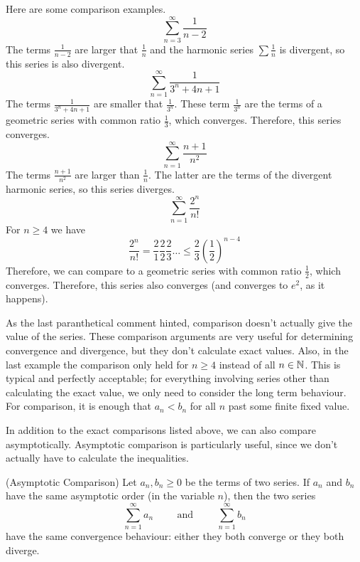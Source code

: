 \documentclass[fleqn,letterpaper]{report}
\begin{document}
\begin{example} Here are some comparison examples.
\label{example-comparison1}
\begin{equation*}
\sum_{n=3}^\infty \frac{1}{n-2}
\end{equation*}
The terms $\frac{1}{n-2}$ are larger that $\frac{1}{n}$ and
the harmonic series $\sum \frac{1}{n}$ is divergent, so this
series is also divergent.
\begin{equation*}
\sum_{n=1}^\infty \frac{1}{3^n + 4n + 1}
\end{equation*}
The terms $\frac{1}{3^n + 4n + 1}$ are smaller that
$\frac{1}{3^n}$. These term $\frac{1}{3^n}$ are the terms of a geometric
series with common ratio $\frac{1}{3}$, which
converges. Therefore, this series converges.
\begin{equation*}
\sum_{n=1}^\infty \frac{n+1}{n^2}
\end{equation*}
The terms $\frac{n+1}{n^2}$ are larger than $\frac{1}{n}$. The
latter are the terms of the divergent harmonic series, so this
series diverges.
\begin{equation*}
\sum_{n=1}^\infty \frac{2^n}{n!}
\end{equation*}
For $n \geq 4$ we have
\begin{equation*}
\frac{2^n}{n!} = \frac{2}{1} \frac{2}{2} \frac{2}{3} \ldots \leq
\frac{2}{3} \left( \frac{1}{2} \right)^{n-4}
\end{equation*}
Therefore, we can compare to a geometric series with
common ratio $\frac{1}{2}$, which converges. Therefore, this
series also converges (and converges to $e^2$, as it happens).
\end{example}

As the last paranthetical comment hinted, comparison doesn't
actually give the value of the series. These comparison
arguments are very useful for determining convergence and
divergence, but they don't calculate exact values. Also, in
the last example the comparison only held for $n \geq 4$
instead of all $n \in \mathbb{N}$. This is typical and perfectly
acceptable; for everything involving series other than
calculating the exact value, we only need to consider the long
term behaviour. For comparison, it is enough that $a_n < b_n$
for all $n$ past some finite fixed value. 

In addition to the exact comparisons listed above, we can also
compare asymptotically. Asymptotic comparison is particularly
useful, since we don't actually have to calculate the
inequalities.

\begin{prop}(Asymptotic Comparison) Let $a_n,b_n \geq 0$ be
the terms of two series. If $a_n$ and $b_n$ have the same
asymptotic order (in the variable $n$), then the two series
\begin{equation*}
\sum_{n=1}^\infty a_n \hspace{1cm} \text{and} \hspace{1cm}
\sum_{n=1}^\infty b_n
\end{equation*}
have the same convergence behaviour: either they both converge
or they both diverge. 
\end{prop}
\end{document}
